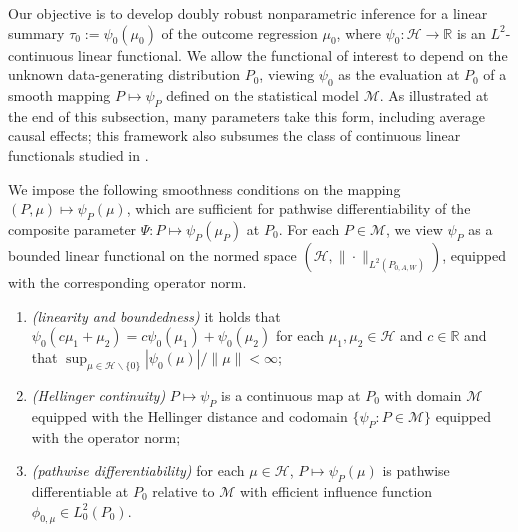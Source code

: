 \documentclass[11pt]{article}
\theoremstyle{plain}
\begin{document}
 
Our objective is to develop doubly robust nonparametric inference for a
linear summary \(\tau_0 := \psi_0(\mu_0)\) of the outcome regression \(\mu_0\),
where \(\psi_0 : \mathcal{H} \to \mathbb{R}\) is an \(L^2\)-continuous linear
functional. We allow the functional of interest to depend on the unknown
data-generating distribution \(P_0\), viewing \(\psi_0\) as the evaluation at
\(P_0\) of a smooth mapping \(P \mapsto \psi_P\) defined on the statistical
model \(\mathcal{M}\). As illustrated at the end of this subsection, many
parameters take this form, including average causal effects; this framework
also subsumes the class of continuous linear functionals studied in
\cite{chernozhukov2022automatic,bradic2019minimax}.
 

We impose the following smoothness conditions on the mapping
\((P,\mu)\mapsto \psi_P(\mu)\), which are sufficient for pathwise
differentiability of the composite parameter \(\Psi : P \mapsto \psi_P(\mu_P)\)
at \(P_0\). For each \(P\in\mathcal{M}\), we view \(\psi_P\) as a bounded linear
functional on the normed space \((\mathcal{H}, \|\cdot\|_{L^2(P_{0,A,W})})\),
equipped with the corresponding operator norm.



\begin{enumerate}[label=\bf{A\arabic*)}, ref={A\arabic*}, series = introcond]
    \item \textit{(linearity and boundedness)}\label{cond::linear}  it holds that $\psi_0(c\mu_1 + \mu_2) = c\psi_0(\mu_1) + \psi_0(\mu_2)$ for each $\mu_1,\mu_2\in \mathcal{H}$ and $c\in\mathbb{R}$ and that $\sup_{\mu \in \mathcal{H}\backslash \{0\}} |\psi_0(\mu)|/\|\mu\| < \infty$;
    \item \textit{(Hellinger continuity)} \label{cond::continuous}  $P \mapsto \psi_P$ is a continuous map at $P_0$ with domain $\mathcal{M}$ equipped with the Hellinger distance and codomain $\{\psi_P: P \in \mathcal{M}\}$ equipped with the operator norm;  
    \item \textit{(pathwise differentiability)}\label{cond::pathwise} for each $\mu \in \mathcal{H}$, $P \mapsto \psi_P(\mu)$ is pathwise differentiable at $P_0$ relative to $\mathcal{M}$ with efficient influence function $\phi_{0, \mu} \in L^2_0(P_0)$.
\end{enumerate} 
\end{document}
